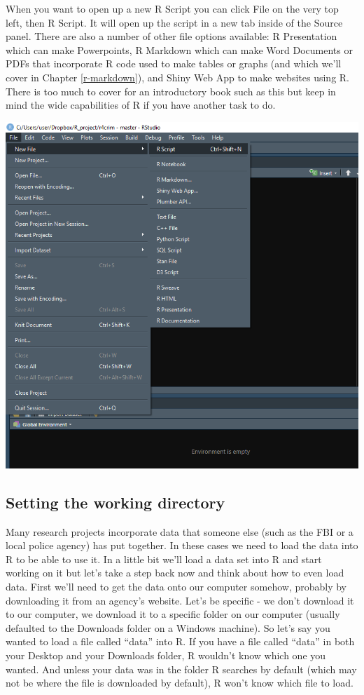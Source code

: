 \documentclass[
  12pt,
]{book}
\begin{document}
When you want to open up a new R Script you can click File on the very top left, then R Script. It will open up the script in a new tab inside of the Source panel. There are also a number of other file options available: R Presentation which can make Powerpoints, R Markdown which can make Word Documents or PDFs that incorporate R code used to make tables or graphs (and which we'll cover in Chapter \ref{r-markdown}), and Shiny Web App to make websites using R. There is too much to cover for an introductory book such as this but keep in mind the wide capabilities of R if you have another task to do.

\includegraphics{images/rstudio_2.PNG}

\hypertarget{setting-the-working-directory}{%
\subsection{Setting the working directory}\label{setting-the-working-directory}}

Many research projects incorporate data that someone else (such as the FBI or a local police agency) has put together. In these cases we need to load the data into R to be able to use it. In a little bit we'll load a data set into R and start working on it but let's take a step back now and think about how to even load data. First we'll need to get the data onto our computer somehow, probably by downloading it from an agency's website. Let's be specific - we don't download it to our computer, we download it to a specific folder on our computer (usually defaulted to the Downloads folder on a Windows machine). So let's say you wanted to load a file called ``data'' into R. If you have a file called ``data'' in both your Desktop and your Downloads folder, R wouldn't know which one you wanted. And unless your data was in the folder R searches by default (which may not be where the file is downloaded by default), R won't know which file to load.
\end{document}
